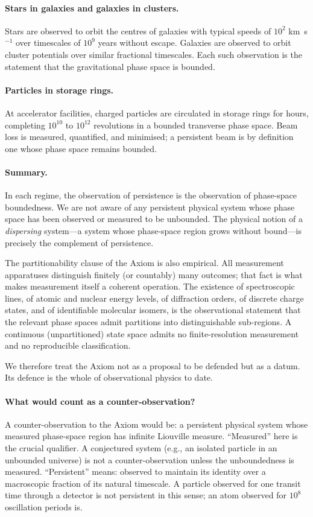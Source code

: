 \paragraph{Stars in galaxies and galaxies in clusters.} Stars are observed to orbit the centres of galaxies with typical speeds of $10^{2}$ km~s$^{-1}$ over timescales of $10^{9}$ years without escape. Galaxies are observed to orbit cluster potentials over similar fractional timescales. Each such observation is the statement that the gravitational phase space is bounded.

\paragraph{Particles in storage rings.} At accelerator facilities, charged particles are circulated in storage rings for hours, completing $10^{10}$ to $10^{12}$ revolutions in a bounded transverse phase space. Beam loss is measured, quantified, and minimised; a persistent beam is by definition one whose phase space remains bounded.

\paragraph{Summary.} In each regime, the observation of persistence is the observation of phase-space boundedness. We are not aware of any persistent physical system whose phase space has been observed or measured to be unbounded. The physical notion of a \emph{dispersing} system---a system whose phase-space region grows without bound---is precisely the complement of persistence.

The partitionability clause of the Axiom is also empirical. All measurement apparatuses distinguish finitely (or countably) many outcomes; that fact is what makes measurement itself a coherent operation. The existence of spectroscopic lines, of atomic and nuclear energy levels, of diffraction orders, of discrete charge states, and of identifiable molecular isomers, is the observational statement that the relevant phase spaces admit partitions into distinguishable sub-regions. A continuous (unpartitioned) state space admits no finite-resolution measurement and no reproducible classification.

We therefore treat the Axiom not as a proposal to be defended but as a datum. Its defence is the whole of observational physics to date.

\paragraph{What would count as a counter-observation?} A counter-observation to the Axiom would be: a persistent physical system whose measured phase-space region has infinite Liouville measure. ``Measured'' here is the crucial qualifier. A conjectured system (e.g., an isolated particle in an unbounded universe) is not a counter-observation unless the unboundedness is measured. ``Persistent'' means: observed to maintain its identity over a macroscopic fraction of its natural timescale. A particle observed for one transit time through a detector is not persistent in this sense; an atom observed for $10^{8}$ oscillation periods is.

